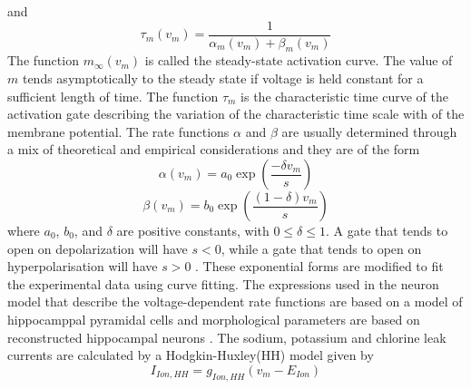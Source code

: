 \documentclass[fleqn]{report}
\numberwithin{equation}{section}
\numberwithin{equation}{section}
\begin{document}
				and
				\begin{equation} %
				\tau_m(v_m)=\frac{1}{\alpha_m(v_m)+\beta_m(v_m)}
				\end{equation}
				The function $m_\infty(v_m)$ is called the steady-state activation curve. The value of $m$ tends asymptotically to the steady state if voltage is held constant for a sufficient length of time. The function $\tau_m$ is the characteristic time curve of the activation gate describing the variation of the characteristic time scale with of the membrane potential. 
				The rate functions $\alpha$ and $\beta$ are usually determined through a mix of theoretical and empirical considerations and they are of the form
				\begin{equation} %
				\alpha(v_m)=a_0 \exp(\frac{-\delta{v_m}}{s})
				\end{equation}
				\begin{equation} %
				\beta(v_m)=b_0 \exp(\frac{(1-\delta){v_m}}{s})
				\end{equation}
				where $ a_0 $, $ b_0 $, and $ \delta $ are positive constants, with $0 \leq\delta\leq 1 $. A gate that tends to open on depolarization will have $s < 0$, while a gate that tends to open on hyperpolarisation will have $s > 0$ \citep{Willms1999}. These exponential forms are modified to fit the experimental data using curve fitting. The expressions used in the neuron model that describe the voltage-dependent rate functions are based on a model of hippocamppal pyramidal cells \citep{Traub1994} and morphological parameters are based on reconstructed hippocampal neurons \citep{Cannon1998}. The sodium, potassium and chlorine leak currents are calculated by a Hodgkin-Huxley(HH) model given by
				 \begin{equation} %
				I_{Ion,HH}=g_{Ion,HH}(v_m-E_{Ion})
				\end{equation} 
\end{document}
